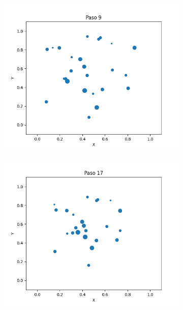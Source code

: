 \documentclass{report}
\begin{document}
\begin{figure}[h]
\begin{subfigure}[b]{0.3\textwidth}
         \centering
         \includegraphics[width=\textwidth]{Images/Images_m/p9pm_t09.png}
     \end{subfigure}
     \begin{subfigure}[b]{0.3\textwidth}
         \centering
         \includegraphics[width=\textwidth]{Images/Images_m/p9pm_t17.png}
     \end{subfigure}
     \begin{subfigure}[b]{0.3\textwidth}
         \centering

\end{subfigure}
\end{figure}
\end{document}
